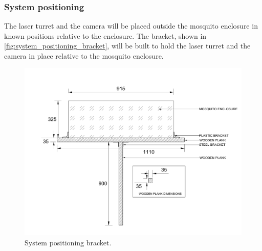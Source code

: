 \subsubsection{System positioning}\label{subsubsec:system_positioning}
The laser turret and the camera will be placed outside the mosquito enclosure in known positions relative to the enclosure. The bracket, shown in \autoref{fig:system_positioning_bracket}, will be built to hold the laser turret and the camera in place relative to the mosquito enclosure.
\begin{figure}[h]
    \centering
    \includegraphics[width=1\textwidth]{figures/hardware_design/system_positioning.pdf}
    \caption{System positioning bracket.}
    \label{fig:system_positioning_bracket}
\end{figure}



